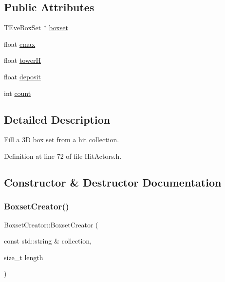 \subsection*{Public Attributes}
\begin{DoxyCompactItemize}
\item 
T\+Eve\+Box\+Set $\ast$ \hyperlink{struct_d_d4hep_1_1_boxset_creator_a6bc0e7f22172b9a51de26b8e74d2e838}{boxset}
\item 
float \hyperlink{struct_d_d4hep_1_1_boxset_creator_a8be1434aa1149653df8e8b3677971dbe}{emax}
\item 
float \hyperlink{struct_d_d4hep_1_1_boxset_creator_a5a4d59452a3be79b9fd59911eb5b555c}{towerH}
\item 
float \hyperlink{struct_d_d4hep_1_1_boxset_creator_af56e8b100eff17e8581503e334c3c6f6}{deposit}
\item 
int \hyperlink{struct_d_d4hep_1_1_boxset_creator_a3c377c27632c9469ef4f821e24fec619}{count}
\end{DoxyCompactItemize}


\subsection{Detailed Description}
Fill a 3D box set from a hit collection. 

Definition at line 72 of file Hit\+Actors.\+h.



\subsection{Constructor \& Destructor Documentation}
\hypertarget{struct_d_d4hep_1_1_boxset_creator_ae1b4d9e1ebffeed4bce0e2be8ab60396}{}\label{struct_d_d4hep_1_1_boxset_creator_ae1b4d9e1ebffeed4bce0e2be8ab60396} 
\subsubsection{\texorpdfstring{Boxset\+Creator()}{BoxsetCreator()}\hspace{0.1cm}{\footnotesize\ttfamily [1/2]}}
{\footnotesize\ttfamily Boxset\+Creator\+::\+Boxset\+Creator (\begin{DoxyParamCaption}\item[{const std\+::string \&}]{collection,  }\item[{size\+\_\+t}]{length }\end{DoxyParamCaption})}



